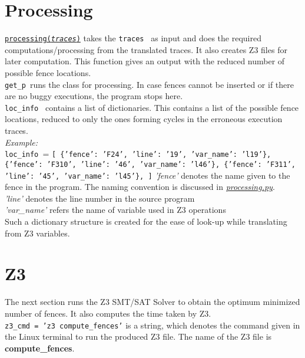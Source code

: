 \documentclass{article}
\newcommand{\var}[1]{\color{OliveGreen} \texttt{#1}\color{black}}
\newcommand{\fun}[2]{\color{Sepia}\texttt{#1(\color{Gray}\textit{#2}\color{Sepia})}\color{black}}
\newcommand{\varinfo}[1]{\scriptsize \texttt{#1} \normalsize}
\begin{document}
\section{Processing}
\par
\href{processing.tex}{\fun{processing}{traces}} takes the \var{traces } as input and does the required computations/processing from the translated traces. It also creates Z3 files for later computation. This function gives an output with the reduced number of possible fence locations.\\

\var{get\_p }runs the class for processing. In case fences cannot be inserted or if there are no buggy executions, the program stops here.\\

\var{loc\_info } contains a list of dictionaries. This contains a list of the possible fence locations, reduced to only the ones forming cycles in the erroneous execution traces.
\\
\textit{Example:}\\
\var{loc\_info }= \varinfo{[\newline
\{'fence': 'F24', 'line': '19', 'var\_name': 'l19'\}, \newline
\{'fence': 'F310', 'line': '46', 'var\_name': 'l46'\}, \newline
\{'fence': 'F311', 'line': '45', 'var\_name': 'l45'\},\newline
]} \newline
\textit{'fence'} denotes the name given to the fence in the program. The naming convention is discussed in \href{processing.tex}{\textit{processing.py}}.
\\
\textit{'line'} denotes the line number in the source program
\\
\textit{'var\_name'} refers the name of variable used in Z3 operations
\\
Such a dictionary structure is created for the ease of look-up while translating from Z3 variables.

\section{Z3}
\par
The next section runs the Z3 SMT/SAT Solver to obtain the optimum minimized number of fences. It also computes the time taken by Z3.\\

\var{z3\_cmd }\varinfo{= 'z3 compute_fences'} is a string, which denotes the command given in the Linux terminal to run the produced Z3 file. The name of the Z3 file is \textbf{compute_fences}.\\
\end{document}

